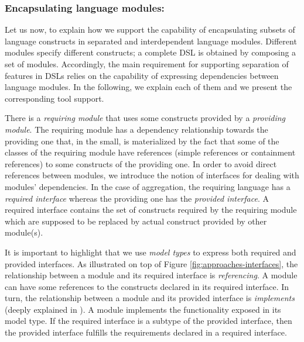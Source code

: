 \subsubsection{Encapsulating language modules:} Let us now, to explain how we support the capability of encapsulating subsets of language constructs in separated and interdependent language modules. Different modules specify different constructs; a complete DSL is obtained by composing a set of modules. Accordingly, the main requirement for supporting separation of features in DSLs relies on the capability of expressing dependencies between language modules. In the following, we explain each of them and we present the corresponding tool support. 


There is a \textit{requiring module} that uses some constructs provided by a \textit{providing module}. The requiring module has a dependency relationship towards the providing one that, in the small, is materialized by the fact that some of the classes of the requiring module have references (simple references or containment references) to some constructs of the providing one. In order to avoid direct references between modules, we introduce the notion of interfaces for dealing with modules' dependencies. In the case of aggregation, the requiring language has a \textit{required interface} whereas the providing one has the \textit{provided interface}. A required interface contains the set of constructs required by the requiring module which are supposed to be replaced by actual construct provided by other module(s).

It is important to highlight that we use \textit{model types} \cite{Steel:2007} to express both required and provided interfaces. As illustrated on top of Figure \ref{fig:approaches-interfaces}, the relationship between a module and its required interface is \textit{referencing}. A module can have some references to the constructs declared in its required interface. In turn, the relationship between a module and its provided interface is \textit{implements} (deeply explained in \cite{Degueule:2015}). A module implements the functionality exposed in its model type. If the required interface is a subtype of the provided interface, then the provided interface fulfills the requirements declared in a required interface. %

